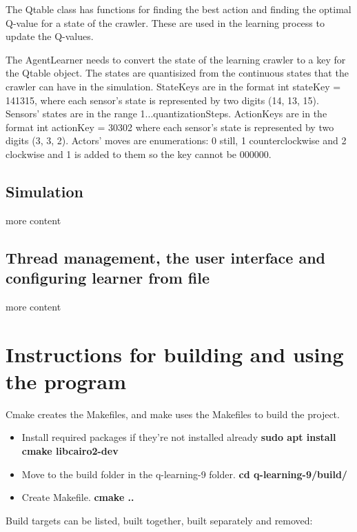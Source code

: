 \documentclass{article}
\begin{document}
The Qtable class has functions for finding the best action and finding
the optimal Q-value for a state of the crawler. These are used in the
learning process to update the Q-values.

The AgentLearner needs to convert the state of the learning crawler to a key
for the Qtable object. The states are quantisized from the continuous states
that the crawler can have in the simulation. StateKeys are in the format
int stateKey = 141315, where each sensor's
state is represented by two digits (14, 13, 15). Sensors' states are
in the range 1...quantizationSteps. ActionKeys are in the format
int actionKey = 30302 where each sensor's
state is represented by two digits (3, 3, 2). Actors' moves are
enumerations: 0 still, 1 counterclockwise and 2 clockwise and 1 is
added to them so the key cannot be 000000.

\subsection{Simulation}

more content

\subsection{Thread management,
the user interface and configuring learner from file}

more content


\section{Instructions for building and using the program}

Cmake creates the Makefiles, and make uses the Makefiles to build the project.

\begin{itemize}
  \item Install required packages if they're not installed already
  \textbf{sudo apt install cmake libcairo2-dev}

  \item Move to the build folder in the q-learning-9 folder.
  \textbf{cd q-learning-9/build/}

  \item Create Makefile.
  \textbf{cmake ..}
\end{itemize}

Build targets can be listed, built together, built separately and removed:
\end{document}
